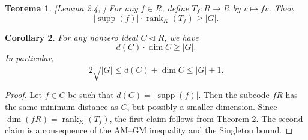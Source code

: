 \documentclass{article}
\newtheorem{theorem}{Teorema}
\newtheorem{corollary}[theorem]{Corollary}
\DeclareMathOperator{\rank}{rank}
\DeclareMathOperator{\supp}{supp}
\begin{document}

\begin{theorem} \label{teoremaSuppRank} [Lemma 2.4, \cite{Borello2022Ideals}]
For any $f \in  R$, define $T_f \colon  R \to  R$ by $v \mapsto f v$.
Then
\[
|\supp(f)| \cdot \rank_K(T_f) \ge |G|.
\]
\end{theorem}

\begin{corollary} \label{Cota inferior}
For any nonzero ideal $C\triangleleft R$, we have
\[
d(C)\cdot \dim C \ge |G|.
\]
In particular,
\[
2\sqrt{|G|} \le d(C) + \dim C \le |G| + 1.
\]
\end{corollary}

\begin{proof}
Let $f \in C$ be such that $d(C) = |\supp(f)|$.
Then the subcode $f  R$ has the same minimum distance as $C$,
but possibly a smaller dimension.
Since $\dim(f  R) = \rank_K(T_f)$,
the first claim follows from Theorem \ref{Cota inferior}.
The second claim is a consequence of the AM--GM inequality
and the Singleton bound.
\end{proof}
\end{document}
